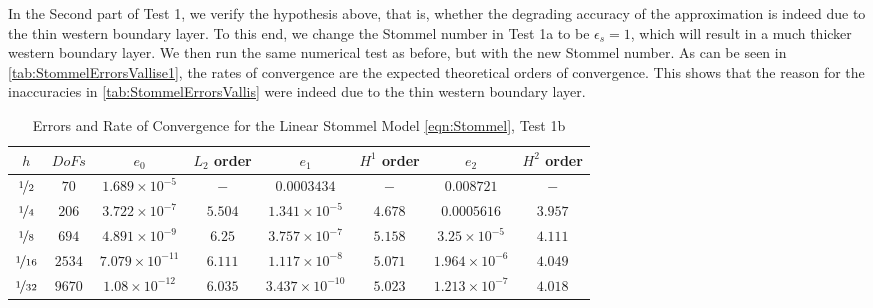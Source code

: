 In the Second part of Test 1, we verify the hypothesis above, that is, whether
the degrading accuracy of the approximation is indeed due to the thin western
boundary layer. To this end, we change the Stommel number in Test 1a to be
$\epsilon_s=1$, which will result in a much thicker western boundary layer. We
then run the same numerical test as before, but with the new Stommel number. As
can be seen in \autoref{tab:StommelErrorsVallise1}, the rates of convergence are
the expected theoretical orders of convergence. This shows that the reason for
the inaccuracies in \autoref{tab:StommelErrorsVallis} were indeed due to the
thin western boundary layer.

\begin{table}%
\begin{center}
\begin{tabular}{|c|c|c|c|c|c|c|c|}%
  \hline
  $h$ & $DoFs$ & $e_0$ & $L_2$ order & $e_1$ & $H^1$ order & $e_2$ & $H^2$ order \\[0.2em] %
  \hline
  $\nicefrac{1}{2}$ & $70$ & $1.689\times 10^{-5}$ & $-$ & $0.0003434$ & $-$ & $0.008721$ & $-$ \\[0.2em] %
  $\nicefrac{1}{4}$ & $206$ & $3.722\times 10^{-7}$ & $5.504$ & $1.341\times 10^{-5}$ & $4.678$ & $0.0005616$ & $3.957$ \\[0.2em] %
  $\nicefrac{1}{8}$ & $694$ & $4.891\times 10^{-9}$ & $6.25$ & $3.757\times 10^{-7}$ & $5.158$ & $3.25\times 10^{-5}$ & $4.111$ \\[0.2em] %
  $\nicefrac{1}{16}$ & $2534$ & $7.079\times 10^{-11}$ & $6.111$ & $1.117\times 10^{-8}$ & $5.071$ & $1.964\times 10^{-6}$ & $4.049$ \\[0.2em] %
  $\nicefrac{1}{32}$ & $9670$ & $1.08\times 10^{-12}$ & $6.035$ & $3.437\times 10^{-10}$ & $5.023$ & $1.213\times 10^{-7}$ & $4.018$ \\[0.2em] %
  \hline
\end{tabular}
\end{center}
\caption{Errors and Rate of Convergence for the Linear Stommel Model \eqref{eqn:Stommel}, Test 1b \cite{Vallis06}}
\label{tab:StommelErrorsVallise1}
\end{table}

